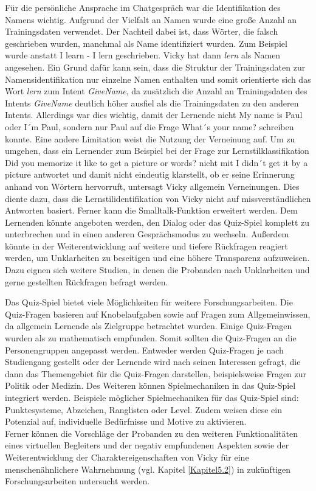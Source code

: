 Für die persönliche Ansprache im Chatgespräch war die Identifikation des Namens wichtig.
Aufgrund der Vielfalt an Namen wurde eine große Anzahl an Trainingsdaten verwendet. 
Der Nachteil dabei ist, dass Wörter, die falsch geschrieben wurden, 
manchmal als Name identifiziert wurden. Zum Beispiel wurde anstatt \glqq I learn\grqq{} -
\glqq I lern\grqq{} geschrieben. Vicky hat dann \textit{lern} als Namen angesehen. 
Ein Grund dafür kann sein, dass die Struktur der Trainingsdaten zur Namensidentifikation nur 
einzelne Namen enthalten und somit orientierte sich das Wort \textit{lern} zum Intent \textit{GiveName}, 
da zusätzlich die 
Anzahl an Trainingsdaten des Intents \textit{GiveName} 
deutlich höher ausfiel als die Trainingsdaten zu den anderen Intents.
Allerdings war dies wichtig, damit der Lernende nicht  
\glqq My name is Paul\grqq{} oder \glqq I´m Paul\grqq{}, sondern nur \glqq Paul\grqq{} auf die 
Frage \glqq What´s your name?\grqq{} schreiben konnte. Eine andere Limitation weist die Nutzung der Verneinung auf. 
Um zu umgehen, dass ein Lernender zum Beispiel bei der Frage zur Lernstilklassifikation \glqq Did you memorize it like to get 
a picture or words?\grqq{} nicht mit \glqq I didn´t get it by a picture\grqq{} antwortet und damit nicht eindeutig klarstellt, ob er seine 
Erinnerung anhand von Wörtern hervorruft, untersagt Vicky allgemein Verneinungen. Dies diente dazu, dass die Lernstilidentifikation von Vicky 
nicht auf missverständlichen Antworten basiert.
Ferner kann die Smalltalk-Funktion erweitert werden. Dem Lernenden könnte angeboten werden, den Dialog oder das Quiz-Spiel 
komplett zu unterbrechen und in einen anderen Gesprächsmodus zu wechseln. Außerdem könnte in der Weiterentwicklung
auf weitere und tiefere Rückfragen reagiert werden, um Unklarheiten zu beseitigen und eine höhere Transparenz aufzuweisen. 
Dazu eignen sich weitere Studien, in denen die Probanden nach Unklarheiten und gerne gestellten Rückfragen befragt werden.

Das Quiz-Spiel bietet viele Möglichkeiten für weitere Forschungsarbeiten.
Die Quiz-Fragen basieren auf Knobelaufgaben sowie auf Fragen zum Allgemeinwissen, da allgemein Lernende als Zielgruppe betrachtet wurden. 
Einige Quiz-Fragen wurden als zu mathematisch empfunden. Somit sollten die Quiz-Fragen an die Personengruppen 
angepasst werden. Entweder werden Quiz-Fragen je nach Studiengang gestellt oder der Lernende wird nach seinen Interessen gefragt, die  
dann das Themengebiet für die Quiz-Fragen darstellen, beispielsweise Fragen zur Politik oder Medizin.
Des Weiteren können Spielmechaniken  in das Quiz-Spiel integriert werden. Beispiele 
möglicher Spielmechaniken für das Quiz-Spiel sind: Punktesysteme, Abzeichen, Ranglisten oder Level. 
Zudem weisen diese ein Potenzial auf, individuelle Bedürfnisse und Motive zu aktivieren. \parencite[276]{Blohm.2013} \\
Ferner können die Vorschläge der Probanden zu den weiteren Funktionalitäten eines virtuellen Begleiters und 
der negativ empfundenen Aspekten sowie der Weiterentwicklung der Charaktereigenschaften von Vicky für eine menschenähnlichere Wahrnehmung
(vgl. Kapitel \ref{Kapitel5.2}) in zukünftigen Forschungsarbeiten untersucht werden.


